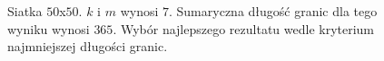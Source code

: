 \begin{figure}[h]
\begin{subfigure}{.33\textwidth}
    \caption[short]{}
\end{subfigure}
\caption{Siatka $50$x$50$. $k$ i $m$ wynosi $7$.
Sumaryczna długość granic dla tego wyniku wynosi $365$.
Wybór najlepszego rezultatu wedle kryterium najmniejszej długości granic.}
\label{result:m:2}
\end{figure}


\begin{figure}[h]
\centering
\begin{subfigure}{.33\textwidth}
    \centering
    \caption[short]{}
\end{subfigure}%
\begin{subfigure}{.33\textwidth}
    \centering
    \caption[short]{}

\end{subfigure}
\end{figure}
